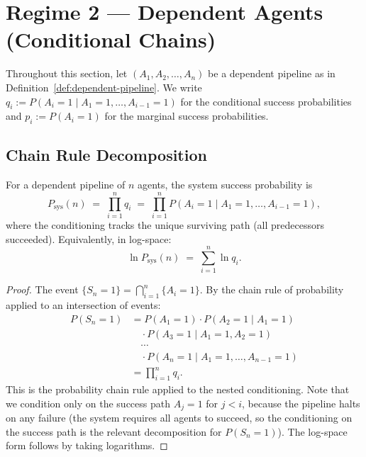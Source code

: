 \section{Regime 2 --- Dependent Agents (Conditional Chains)}
\label{sec:regime2}

Throughout this section, let $(A_1, A_2, \ldots, A_n)$ be a dependent pipeline as in
Definition~\ref{def:dependent-pipeline}. We write $q_i := P(A_i = 1 \mid A_1 = 1,
\ldots, A_{i-1} = 1)$ for the conditional success probabilities and $p_i := P(A_i = 1)$
for the marginal success probabilities.

\subsection{Chain Rule Decomposition}

\begin{theorem}
\label{thm:chain-rule}
For a dependent pipeline of $n$ agents, the system success probability is
\[
  P_{\mathrm{sys}}(n) \;=\; \prod_{i=1}^{n} q_i
  \;=\; \prod_{i=1}^{n} P(A_i = 1 \mid A_1 = 1, \ldots, A_{i-1} = 1),
\]
where the conditioning tracks the unique surviving path (all predecessors succeeded).
Equivalently, in log-space:
\[
  \ln P_{\mathrm{sys}}(n) \;=\; \sum_{i=1}^{n} \ln q_i.
\]
\end{theorem}

\begin{proof}
The event $\{S_n = 1\} = \bigcap_{i=1}^{n} \{A_i = 1\}$. By the chain rule of probability
applied to an intersection of events:
\begin{align*}
  P(S_n = 1) &= P(A_1 = 1) \cdot P(A_2 = 1 \mid A_1 = 1) \\
  &\quad \cdot P(A_3 = 1 \mid A_1 = 1, A_2 = 1) \\
  &\quad \cdots \\
  &\quad \cdot P(A_n = 1 \mid A_1 = 1, \ldots, A_{n-1} = 1) \\
  &= \prod_{i=1}^{n} q_i.
\end{align*}
This is the probability chain rule applied to the nested conditioning. Note that we condition
only on the success path $A_j = 1$ for $j < i$, because the pipeline halts on any failure
(the system requires all agents to succeed, so the conditioning on the success path is the
relevant decomposition for $P(S_n = 1)$). The log-space form follows by taking logarithms.
\end{proof}

